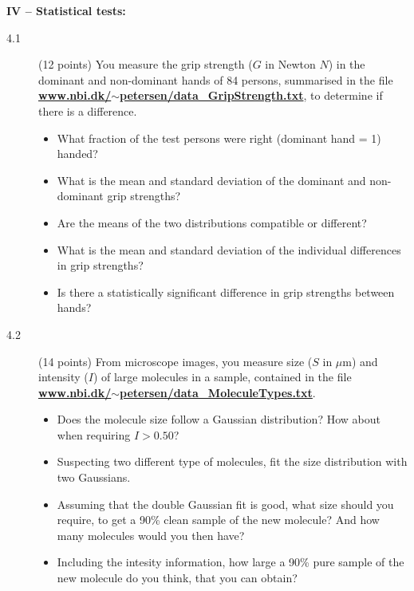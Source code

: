 \documentclass[11pt]{article}
\begin{document}

\noindent
{\bf IV -- Statistical tests:}
\begin{description}
\item[4.1] (12 points)
  You measure the grip strength ($G$ in Newton $N$) in the dominant and non-dominant hands of 84 persons, summarised in the file \href{http://www.nbi.dk/~petersen/data\_GripStrength.txt}{\bf www.nbi.dk/$\sim$petersen/data\_GripStrength.txt}, to determine if there is a difference.
  \vspace*{-1ex}
  \begin{itemize}
    \item What fraction of the test persons were right (dominant hand = 1) handed?
    \item What is the mean and standard deviation of the dominant and non-dominant grip strengths?
    \item Are the means of the two distributions compatible or different?
    \item What is the mean and standard deviation of the individual differences in grip strengths?
    \item Is there a statistically significant difference in grip strengths between hands?
  \end{itemize}
%
\item[4.2] (14 points)
  From microscope images, you measure size ($S$ in $\mu$m) and intensity ($I$) of large molecules in a sample,
  contained in the file \href{http://www.nbi.dk/~petersen/data\_MoleculeTypes.txt}{\bf www.nbi.dk/$\sim$petersen/data\_MoleculeTypes.txt}.
  \vspace*{-1ex}
  \begin{itemize}
    \item Does the molecule size follow a Gaussian distribution? How about when requiring $I > 0.50$?
    \item Suspecting two different type of molecules, fit the size distribution with two Gaussians.
    \item Assuming that the double Gaussian fit is good, what size should you require, to get a
      90\% clean sample of the new molecule? And how many molecules would you then have?
    \item Including the intesity information, how large a 90\% pure sample of the new molecule do you
      think, that you can obtain?
  \end{itemize}
\end{description}
\end{document}
